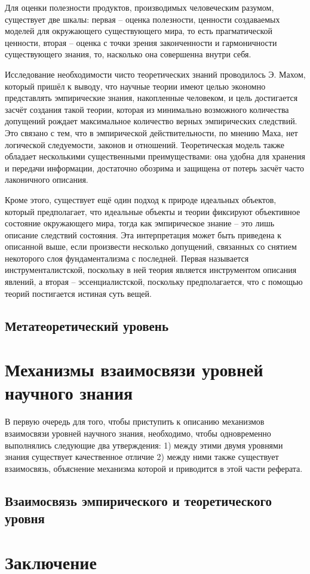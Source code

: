 \documentclass[14pt]{article}
\begin{document}
  Для оценки полезности продуктов, производимых человеческим разумом, существует две шкалы: первая -- оценка полезности, ценности создаваемых моделей для окружающего существующего мира, то есть прагматической ценности, вторая -- оценка с точки зрения законченности и гармоничности существующего знания, то, насколько она совершенна внутри себя. 
  
  Исследование необходимости чисто теоретических знаний проводилось Э. Махом, который пришёл к выводу, что научные теории имеют целью экономно представлять эмпирические знания, накопленные человеком, и цель достигается засчёт создания такой теории, которая из минимально возможного количества допущений рождает максимальное количество верных эмпирических следствий. Это связано с тем, что в эмпирической действительности, по мнению Маха, нет логической следуемости, законов и отношений. Теоретическая модель также обладает несколькими существенными преимуществами: она удобна для хранения и передачи информации, достаточно обозрима и защищена от потерь засчёт часто лаконичного описания.  
  
Кроме этого, существует ещё один подход к природе идеальных объектов, который предполагает, что идеальные объекты и теории фиксируют объективное состояние окружающего мира, тогда как эмпирическое знание -- это лишь описание следствий состояния. Эта интерпретация может быть приведена к описанной выше, если произвести несколько допущений, связанных со снятием некоторого слоя фундаментализма с последней. Первая называется инструменталистской, поскольку в ней теория является инструментом описания явлений, а вторая -- эссенциалистской, поскольку предполагается, что с помощью теорий постигается истиная суть вещей.
\subsection{Метатеоретический уровень}
\section{Механизмы взаимосвязи уровней научного знания}
В первую очередь для того, чтобы приступить к описанию механизмов взаимосвязи уровней научного знания, необходимо, чтобы одновременно выполнялись следующие два утверждения:
1) между этими двумя уровнями знания существует качественное отличие
2) между ними также существует взаимосвязь, объяснение механизма которой и приводится в этой части реферата.
\subsection{Взаимосвязь эмпирического и теоретического уровня}
\section{Заключение}
\end{document}

